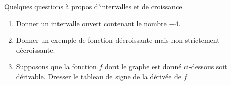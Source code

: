 
\begin{exercice}\label{exoanalyseCTU-0001}

Quelques questions à propos d'intervalles et de croissance.

\begin{enumerate}
    \item
        Donner un intervalle ouvert contenant le nombre \( -4\).
    \item
        Donner un exemple de fonction décroissante mais non strictement décroissante.
    \item
        Supposons que la fonction \( f\) dont le graphe est donné ci-dessous soit dérivable. Dresser le tableau de signe de la dérivée de \( f\).

        \begin{center}
            
        \end{center}
\end{enumerate}


\end{exercice}
